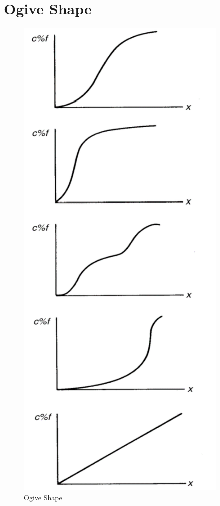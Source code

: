 \documentclass[12pt]{article}
\begin{document}
\section{Ogive Shape}\label{ogive-shape}

\begin{figure}[H]
\centering
\includegraphics[width=4in]{Ogive_Shape.png}
\caption{Ogive Shape}
\end{figure}
\end{document}
